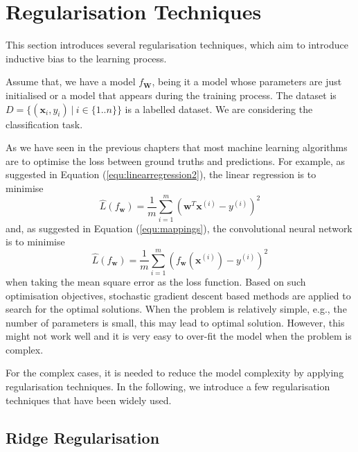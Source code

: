\section{Regularisation Techniques}

This section introduces several regularisation techniques, which aim to introduce inductive bias to the learning process. 

Assume that, we have a model $f_{\textbf{W}}$, being it a model whose parameters are just initialised or a model that appears during the training process. The dataset is $D=\{(\textbf{x}_i,y_i)~|~i\in \{1..n\}\}$ is a labelled dataset. We are considering the classification task. 

As we have seen in the previous chapters that most machine learning algorithms are to optimise the loss between ground truths and predictions. For example, as suggested in Equation (\ref{equ:linearregression2}), the linear regression is to minimise 
\begin{equation}\label{equ:linearregression20}
    \hat{L}(f_\textbf{w}) = \frac{1}{m}\sum_{i=1}^m(\textbf{w}^T\textbf{x}^{(i)}-y^{(i)})^2
\end{equation}
and, as suggested in Equation (\ref{equ:mappings}), the convolutional neural network is to minimise 
\begin{equation}\label{equ:linearregression20}
    \hat{L}(f_\textbf{w}) = \frac{1}{m}\sum_{i=1}^m(f_{\textbf{w}}(\textbf{x}^{(i)})-y^{(i)})^2
\end{equation}
when taking the mean square error as the loss function. 
%
Based on such optimisation objectives, stochastic gradient descent based methods are applied to search for the optimal solutions. 
When the problem is relatively simple, e.g., the number of parameters is small, this may lead to optimal solution. However, this might not work well and it is very easy to over-fit the model when the problem is complex.  

For the complex cases, it is needed to reduce the model complexity by applying regularisation techniques. In the following, we introduce a few regularisation techniques that have been widely used.   


\subsection{Ridge Regularisation}

